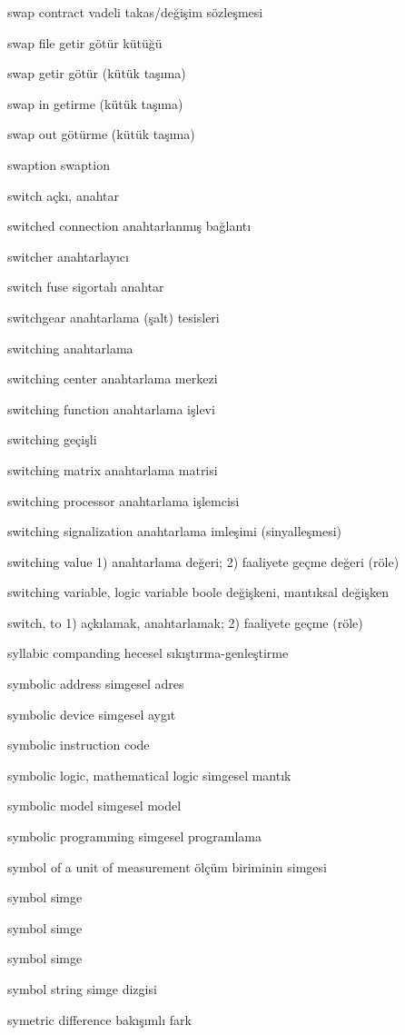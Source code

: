 \documentclass[12pt,fleqn]{article}\usepackage{../../common}
\begin{document}
swap contract vadeli takas/değişim sözleşmesi

swap file getir götür kütüğü

swap getir götür (kütük taşıma)

swap in getirme (kütük taşıma)

swap out götürme (kütük taşıma)

swaption swaption

switch açkı, anahtar

switched connection anahtarlanmış bağlantı

switcher anahtarlayıcı

switch fuse sigortalı anahtar

switchgear anahtarlama (şalt) tesisleri

switching anahtarlama

switching center anahtarlama merkezi

switching function anahtarlama işlevi

switching geçişli

switching matrix anahtarlama matrisi

switching processor anahtarlama işlemcisi

switching signalization anahtarlama imleşimi (sinyalleşmesi)

switching value 1) anahtarlama değeri; 2) faaliyete geçme değeri (röle)

switching variable, logic variable boole değişkeni, mantıksal değişken

switch, to 1) açkılamak, anahtarlamak; 2) faaliyete geçme (röle)

syllabic companding hecesel sıkıştırma-genleştirme

symbolic address simgesel adres

symbolic device simgesel aygıt

symbolic instruction code

symbolic logic, mathematical logic simgesel mantık

symbolic model simgesel model

symbolic programming simgesel programlama

symbol of a unit of measurement ölçüm biriminin simgesi

symbol simge

symbol simge

symbol simge

symbol string simge dizgisi

symetric difference bakışımlı fark
\end{document}
